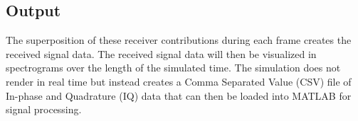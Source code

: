 \subsection{Output}
The superposition of these receiver contributions during each frame creates the received signal data. The received signal data will then be visualized in spectrograms over the length of the simulated time. The simulation does not render in real time but instead creates a Comma Separated Value (CSV) file of In-phase and Quadrature (IQ) data that can then be loaded into MATLAB for signal processing.




